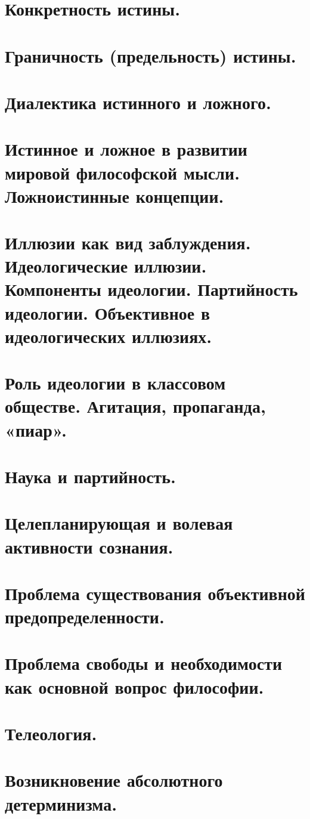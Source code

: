 \section{ Конкретность истины.}
\section{ Граничность (предельность) истины.}
\section{ Диалектика истинного и ложного.}
\section{ Истинное и ложное в развитии мировой философской мысли. Ложноистинные концепции.}
\section{ Иллюзии как вид заблуждения. Идеологические иллюзии. Компоненты идеологии. Партийность идеологии. Объективное в идеологических иллюзиях.}
\section{ Роль идеологии в классовом обществе. Агитация, пропаганда, «пиар».}
\section{ Наука и партийность.}
\section{ Целепланирующая и волевая активности сознания.}
\section{ Проблема существования объективной предопределенности.}
\section{ Проблема свободы и необходимости как основной вопрос философии.}
\section{ Телеология.}
\section{ Возникновение абсолютного детерминизма.}
